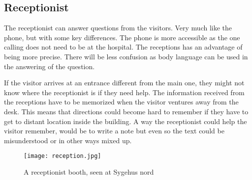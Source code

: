 \subsection{Receptionist}
The receptionist can answer questions from the visitors\cite{job}. Very much like the phone, but with some key differences. The phone is more accessible as the one calling does not need to be at the hospital. The receptions has an advantage of being more precise. There will be less confusion as body language can be used in the answering of the question\cite{body_vs_phone}.

If the visitor arrives at an entrance different from the main one, they might not know where the receptionist is if they need help. The information received from the receptions have to be memorized when the visitor ventures away from the desk. This means that directions could become hard to remember if they have to get to distant location inside the building. A way the receptionist could help the visitor remember, would be to write a note but even so the text could be misunderstood or in other ways mixed up.

  \begin{figure}[ht!]
  \centering
  \texttt{[image: reception.jpg]}
  \caption{A receptionist booth, seen at Sygehus nord}
  \label{overflow}
  \end{figure}
